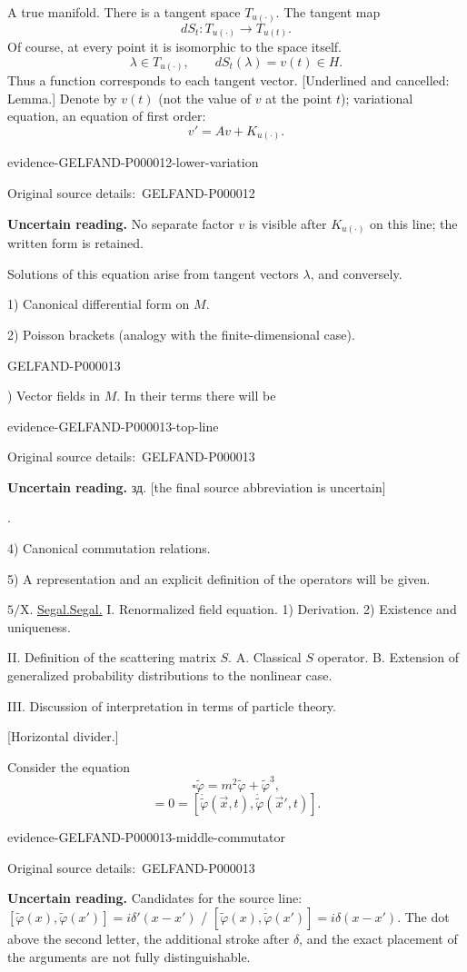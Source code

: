 \documentclass[11pt]{article}
\let\MathUnderline\underline
\renewcommand{\underline}[1]{\ifmmode\MathUnderline{#1}\else\uline{#1}\fi}
\newcommand{\SourcePage}[2]{\par\smallskip\phantomsection\label{#1:source-page}{\small\sffamily\color{blue!55!black}#1}\par\smallskip}
\newcommand{\EvidenceBlock}[4]{%
 \par\smallskip\noindent\begin{minipage}{\linewidth}
 \begin{minipage}[t]{.47\linewidth}\vspace{0pt}\centering
 \csname evidence-#1-#2\endcsname\par
 {\scriptsize\SourceCropCaption\ #1}\par
 \end{minipage}\hfill
 \begin{minipage}[t]{.49\linewidth}\vspace{0pt}\raggedright
 {\small\color{orange!65!black}\textbf{#4} #3}\par
 \end{minipage}
 \end{minipage}\par\smallskip}
\newcommand{\Unclear}[3]{\EvidenceBlock{#1}{#2}{#3}{\ReadingCaption}}
\newcommand{\SourceCropCaption}{Original source details:}\newcommand{\ReadingCaption}{Uncertain reading.}\newcommand{\IncompleteCaption}{Undeciphered passage.}\newcommand{\DiagramCaption}{Diagram and typed description.}
\begin{document}
A true manifold.
There is a tangent space $T_{u(\cdot)}$.
The tangent map
\begin{equation*}
dS_t:T_{u(\cdot)}\longrightarrow T_{u(t)}.
\end{equation*}
Of course, at every point it is isomorphic to the space itself.
\begin{equation*}
\lambda\in T_{u(\cdot)},\qquad dS_t(\lambda)=v(t)\in H.
\end{equation*}
Thus a function corresponds to each tangent vector.
[Underlined and cancelled: Lemma.]
Denote by $v(t)$ (not the value of $v$ at the point $t$); variational equation, an equation of first order:
\begin{equation*}
v'=Av+K_{u(\cdot)}.
\end{equation*}
\Unclear{GELFAND-P000012}{lower-variation}{No separate factor $v$ is visible after $K_{u(\cdot)}$ on this line; the written form is retained.}
Solutions of this equation arise from tangent vectors $\lambda$, and conversely.

1) Canonical differential form on $M$.

2) Poisson brackets (analogy with the finite-dimensional case).


\SourcePage{GELFAND-P000013}{7}
3) Vector fields in $M$. In their terms there will be \Unclear{GELFAND-P000013}{top-line}{зд. [the final source abbreviation is uncertain]}.

4) Canonical commutation relations.

5) A representation and an explicit definition of the operators will be given.

$5/\mathrm X$. \underline{Segal.}
I. Renormalized field equation.
1) Derivation. 2) Existence and uniqueness.

II. Definition of the scattering matrix $S$.
A. Classical $S$ operator.
B. Extension of generalized probability distributions to the nonlinear case.

III. Discussion of interpretation in terms of particle theory.

[Horizontal divider.]

Consider the equation
\begin{equation*}
\square\widetilde\varphi=m^2\widetilde\varphi+\widetilde\varphi^3,
\end{equation*}
\begin{equation*}
[\widetilde\varphi(\vec x,t),\widetilde\varphi(\vec x',t)]
=0=[\dot{\widetilde\varphi}(\vec x,t),\dot{\widetilde\varphi}(\vec x',t)].
\end{equation*}
\Unclear{GELFAND-P000013}{middle-commutator}{Candidates for the source line: $[\widetilde\varphi(x),\widetilde\varphi(x')]=i\delta'(x-x')$ / $[\widetilde\varphi(x),\dot{\widetilde\varphi}(x')]=i\delta(x-x')$. The dot above the second letter, the additional stroke after $\delta$, and the exact placement of the arguments are not fully distinguishable.}
\end{document}
